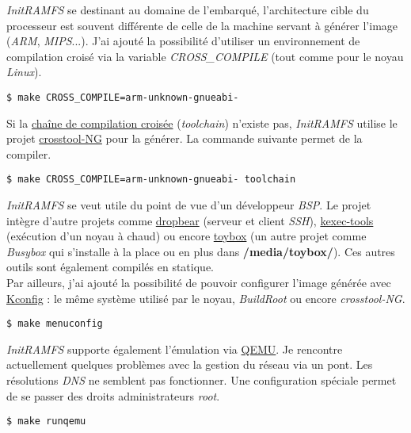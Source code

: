 \documentclass[a4paper]{article}
\begin{document}
\textit{InitRAMFS} se destinant au domaine de l'embarqué, l'architecture cible du processeur est souvent différente de celle de la machine servant à générer l'image (\textit{ARM}, \textit{MIPS}...). J'ai ajouté la possibilité d'utiliser un environnement de compilation croisé via la variable \textit{CROSS\_COMPILE} (tout comme pour le noyau \textit{Linux}).

\begin{verbatim}
$ make CROSS_COMPILE=arm-unknown-gnueabi-
\end{verbatim}

Si la \href{https://fr.wikipedia.org/wiki/Cha\%C3\%AEne_de_compilation}{chaîne de compilation croisée} (\textit{toolchain}) n'existe pas, \textit{InitRAMFS} utilise le projet \href{http://crosstool-ng.org/}{crosstool-NG} pour la générer. La commande suivante permet de la compiler.

\begin{verbatim}
$ make CROSS_COMPILE=arm-unknown-gnueabi- toolchain
\end{verbatim}

\textit{InitRAMFS} se veut utile du point de vue d'un développeur \textit{BSP}. Le projet intègre d'autre projets comme \href{https://matt.ucc.asn.au/dropbear/dropbear.html}{dropbear} (serveur et client \textit{SSH}), \href{http://git.kernel.org/cgit/utils/kernel/kexec/kexec-tools.git/}{kexec-tools} (exécution d'un noyau à chaud) ou encore \href{http://landley.net/toybox/}{toybox} (un autre projet comme \textit{Busybox} qui s'installe à la place ou en plus dans \textbf{/media/toybox/}). Ces autres outils sont également compilés en statique.\\

Par ailleurs, j'ai ajouté la possibilité de pouvoir configurer l'image générée avec \href{http://ymorin.is-a-geek.org/projects/kconfig-frontends}{Kconfig} : le même système utilisé par le noyau, \textit{BuildRoot} ou encore \textit{crosstool-NG}.

\begin{verbatim}
$ make menuconfig
\end{verbatim}

\textit{InitRAMFS} supporte également l'émulation via \href{http://wiki.qemu.org}{QEMU}. Je rencontre actuellement quelques problèmes avec la gestion du réseau via un pont. Les résolutions \textit{DNS} ne semblent pas fonctionner. Une configuration spéciale permet de se passer des droits administrateurs \textit{root}.

\begin{verbatim}
$ make runqemu
\end{verbatim}
\end{document}
